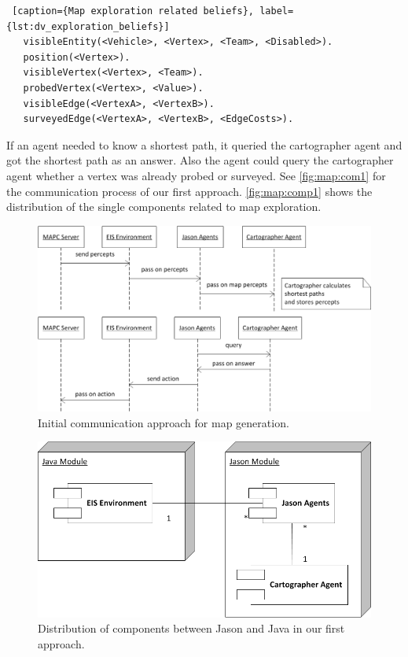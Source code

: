 \begin{lstlisting} [caption={Map exploration related beliefs}, label={lst:dv_exploration_beliefs}]
   visibleEntity(<Vehicle>, <Vertex>, <Team>, <Disabled>).
   position(<Vertex>).
   visibleVertex(<Vertex>, <Team>).
   probedVertex(<Vertex>, <Value>).
   visibleEdge(<VertexA>, <VertexB>).
   surveyedEdge(<VertexA>, <VertexB>, <EdgeCosts>).
\end{lstlisting}

If an agent needed to know a shortest path, it queried the cartographer agent and got the shortest path as an answer.
Also the agent could query the cartographer agent whether a vertex was already probed or surveyed.
See \autoref{fig:map:com1} for the communication process of our first approach.
\autoref{fig:map:comp1} shows the distribution of the single components related to map exploration.
\begin{figure}
  \centering
  \includegraphics[width=\linewidth]{images/map_com_1.png}
  \caption{Initial communication approach for map generation.}
  \label{fig:map:com1}
\end{figure}

\begin{figure}
  \centering
  \includegraphics[width=0.7\linewidth]{images/map_comp_1.png}
  \caption{Distribution of components between Jason and Java in our first approach.}
  \label{fig:map:comp1}
\end{figure}

